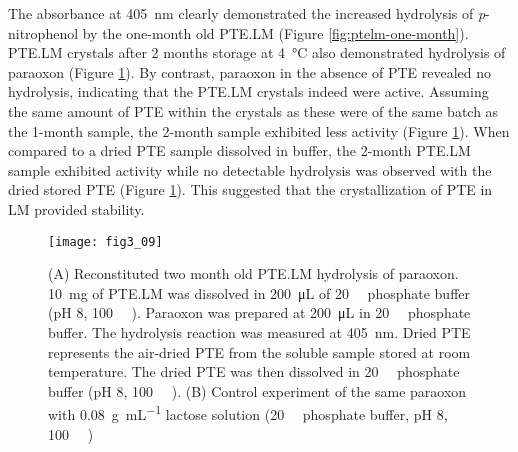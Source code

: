 \begin{refsection}
The absorbance at \SI{405}{\nm} clearly demonstrated the
increased hydrolysis of \emph{p}-nitrophenol by the one-month old PTE.LM
(Figure \ref{fig:ptelm-one-month}). PTE.LM crystals after 2 months
storage at \SI{4}{\celsius} also demonstrated hydrolysis of paraoxon (Figure
\ref{fig:ptelm-two-month}). By contrast, paraoxon in the absence of
PTE revealed no hydrolysis, indicating that the PTE.LM crystals indeed were
active. Assuming the same amount of PTE within the crystals as these were of
the same batch as the 1-month sample, the 2-month sample exhibited less
activity (Figure \ref{fig:ptelm-two-month}). When compared to a dried PTE
sample dissolved in buffer, the 2-month PTE.LM sample exhibited activity while
no detectable hydrolysis was observed with the dried stored PTE (Figure
\ref{fig:ptelm-two-month}). This suggested that the crystallization of PTE in
LM provided stability.
\begin{figure}[htbp] \centering \texttt{[image: fig3\_09]}
    \caption[(A) Reconstituted two month old PTE.LM hydrolysis of paraoxon.
        \SI{10}{\mg} of PTE.LM was dissolved in \SI{200}{\micro\liter} of
        \SI{20}{\milli\Molar} phosphate buffer. Paraoxon was prepared at
        \SI{200}{\micro\liter} in \SI{20}{\milli\Molar} phosphate buffer. The
        hydrolysis reaction was measured at \SI{405}{\nm}. Dried PTE represents
        the air-dried PTE that was stored at room temperature and dissolved in
        \SI{20}{\milli\Molar} phosphate buffer (pH 8, \SI{100}{\micro\Molar}
        ). (B) Control experiment of the same paraoxon with
        \SI{0.08}{\gram\per\mL} lactose solution (\SI{20}{\milli\Molar}
        phosphate buffer, pH 8, \SI{100}{\micro\Molar} ).]
        {(A) Reconstituted two month old PTE.LM hydrolysis of paraoxon.
            \SI{10}{\mg} of PTE.LM was dissolved in \SI{200}{\micro\liter} of
            \SI{20}{\milli\Molar} phosphate buffer (pH 8,
            \SI{100}{\micro\Molar} ). Paraoxon was prepared at
            \SI{200}{\micro\liter} in \SI{20}{\milli\Molar} phosphate buffer.
            The hydrolysis reaction was measured at \SI{405}{\nm}.  Dried PTE
            represents the air-dried PTE from the soluble sample stored at room
            temperature. The dried PTE was then dissolved in
            \SI{20}{\milli\Molar} phosphate buffer (pH 8,
            \SI{100}{\micro\Molar} ). (B) Control experiment of the
            same paraoxon with \SI{0.08}{\gram\per\mL} lactose solution
            (\SI{20}{\milli\Molar} phosphate buffer, pH 8,
            \SI{100}{\micro\Molar} )} \label{fig:ptelm-two-month} 
\end{figure}


\end{refsection}
